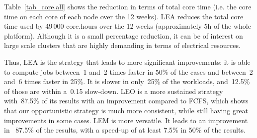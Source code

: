 \documentclass[conference]{IEEEtran}
\begin{document}
Table~\ref{tab_core.all} shows the reduction in terms of total core time (i.e. the core time on each core of each node over the 12 weeks). 
LEA reduces the total core time used by 49\,000 core.hours over the 12 weeks (approximately 5h of the whole platform).
Although it is a small percentage reduction, it can be of interest on large scale clusters that are highly demanding in terms of electrical resources.


Thus, LEA is the strategy that leads to more significant improvements: it is able to compute jobs between~1 and~2 times faster in 50\% of the cases and between~2 and~6 times faster in 25\%.
It is slower in only~25\% of the workloads, and~12.5\% of those are within a~0.15 slow-down.
LEO is a more sustained strategy with~87.5\% of its results with an improvement compared to FCFS, which shows that our opportunistic
strategy is much more consistent, while still having great improvements in some cases.
LEM is more versatile. It leads to an improvement in ~87.5\% of the results, with a speed-up of at least 7.5\% in 50\% of the results.
\end{document}
